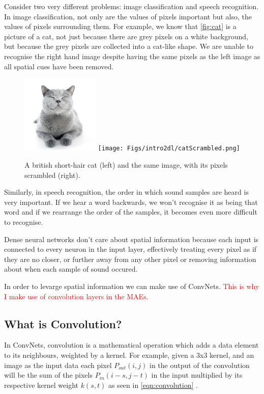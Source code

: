 Consider two very different problems: image classification and speech recognition. In image classification, not only are the values of pixels important but also, the values of pixels surrounding them. For example, we know that \autoref{fig:cat} is a picture of a cat, not just because there are grey pixels on a white background, but because the grey pixels are collected into a cat-like shape. We are unable to recognise the right hand image despite having the same pixels as the left image as all spatial cues have been removed.

\begin{figure}[h]
	\centering
	\includegraphics[width=0.33\textwidth]{Figs/intro2dl/cat.png}
	\texttt{[image: Figs/intro2dl/catScrambled.png]}
	
	\caption{A british short-hair cat (left) and the same image, with its pixels scrambled (right).}
	\label{fig:cat}
\end{figure}

Similarly, in speech recognition, the order in which sound samples are heard is very important. If we hear a word backwards, we won't recognise it as being that word and if we rearrange the order of the samples, it becomes even more difficult to recognise.

Dense neural networks don't care about spatial information because each input is connected to every neuron in the input layer, effectively treating every pixel as if they are no closer, or further away from any other pixel or removing information about when each sample of sound occured.

In order to levarge spatial information we can make use of \acp{ConvNet}. \textcolor{red}{This is why I make use of convolution layers in the \acp{MAE}.}

\subsection{What is Convolution?}
In \acp{ConvNet}, convolution is a mathematical operation which adds a data element to its neighbours, weighted by a kernel. For example, given a 3x3 kernel, and an image as the input data each pixel $P_{out}(i,j)$ in the output of the convolution will be the sum of the pixels $P_{in}(i-s, j-t)$ in the input  multiplied by its respective kernel weight $k(s,t)$ as seen in \autoref{eqn:convolution} \cite{dumoulin2016guide}.

